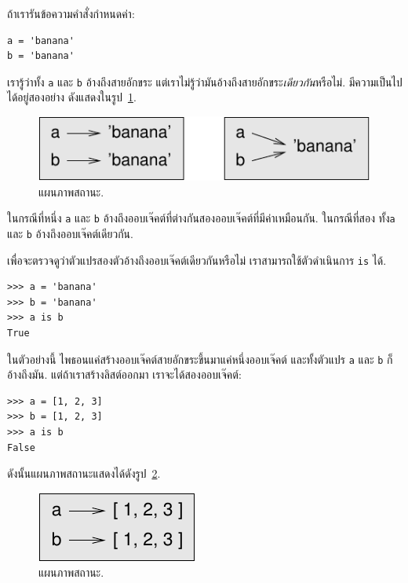 ถ้าเรารันข้อความคำสั่งกำหนดค่า:

\begin{verbatim}
a = 'banana'
b = 'banana'
\end{verbatim}
%
เรารู้ว่าทั้ง \texttt{a} และ \texttt{b} อ้างถึงสายอักขระ
แต่เราไม่รู้ว่ามันอ้างถึงสายอักขระ\emph{เดียวกัน}หรือไม่.
มีความเป็นไปได้อยู่สองอย่าง ดังแสดงในรูป~\ref{fig.list1}.

\begin{figure}
\centerline
{\includegraphics[scale=0.8]{figs/list1.pdf}}
\caption{แผนภาพสถานะ.}
\label{fig.list1}
\end{figure}

ในกรณีที่หนึ่ง \texttt{a} และ \texttt{b} อ้างถึงออบเจ๊คต์ที่ต่างกันสองออบเจ๊คต์ที่มีค่าเหมือนกัน.
ในกรณีที่สอง ทั้ง\texttt{a} และ \texttt{b} อ้างถึงออบเจ๊คต์เดียวกัน.

เพื่อจะตรวจดูว่าตัวแปรสองตัวอ้างถึงออบเจ๊คต์เดียวกันหรือไม่
เราสามารถใช้ตัวดำเนินการ \texttt{is} ได้.

\begin{verbatim}
>>> a = 'banana'
>>> b = 'banana'
>>> a is b
True
\end{verbatim}
%
ในตัวอย่างนี้ ไพธอนแค่สร้างออบเจ๊คต์สายอักขระขึ้นมาแค่หนึ่งออบเจ๊คต์
และทั้งตัวแปร \texttt{a} และ \texttt{b} ก็อ้างถึงมัน.
แต่ถ้าเราสร้างลิสต์ออกมา เราจะได้สองออบเจ๊คต์:

\begin{verbatim}
>>> a = [1, 2, 3]
>>> b = [1, 2, 3]
>>> a is b
False
\end{verbatim}
%
ดังนั้นแผนภาพสถานะแสดงได้ดังรูป~\ref{fig.list2}.

\begin{figure}
\centerline
{\includegraphics[scale=0.8]{figs/list2.pdf}}
\caption{แผนภาพสถานะ.}
\label{fig.list2}
\end{figure}

